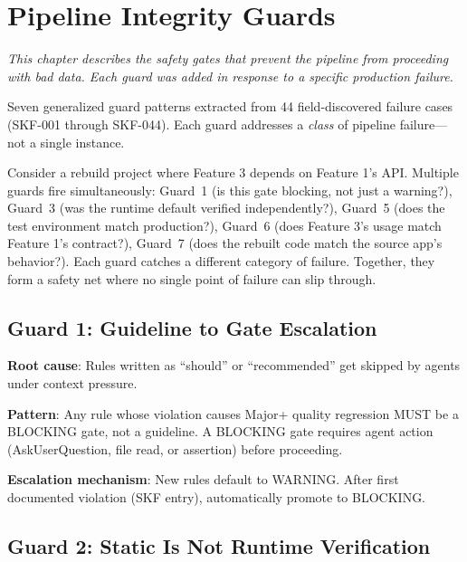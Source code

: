 \documentclass[11pt,a4paper,openright,twoside]{report}
\begin{document}
\chapter{Pipeline Integrity Guards}
\label{ch:guards}

\textit{This chapter describes the safety gates that prevent the pipeline from proceeding with bad data. Each guard was added in response to a specific production failure.}

Seven generalized guard patterns extracted from 44 field-discovered failure cases (SKF-001 through SKF-044). Each guard addresses a \emph{class} of pipeline failure---not a single instance.

\begin{tipbox}
Consider a rebuild project where Feature 3 depends on Feature 1's API. Multiple guards fire simultaneously: Guard~1 (is this gate blocking, not just a warning?), Guard~3 (was the runtime default verified independently?), Guard~5 (does the test environment match production?), Guard~6 (does Feature 3's usage match Feature 1's contract?), Guard~7 (does the rebuilt code match the source app's behavior?). Each guard catches a different category of failure. Together, they form a safety net where no single point of failure can slip through.
\end{tipbox}

\section{Guard 1: Guideline to Gate Escalation}

\textbf{Root cause}: Rules written as ``should'' or ``recommended'' get skipped by agents under context pressure.

\textbf{Pattern}: Any rule whose violation causes Major+ quality regression MUST be a BLOCKING gate, not a guideline. A BLOCKING gate requires agent action (AskUserQuestion, file read, or assertion) before proceeding.

\textbf{Escalation mechanism}: New rules default to WARNING. After first documented violation (SKF entry), automatically promote to BLOCKING.

\section{Guard 2: Static Is Not Runtime Verification}
\end{document}
